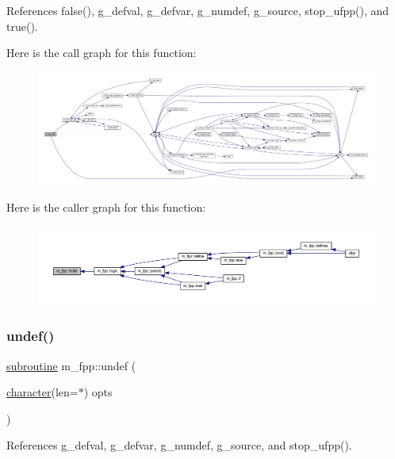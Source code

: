 References false(), g\+\_\+defval, g\+\_\+defvar, g\+\_\+numdef, g\+\_\+source, stop\+\_\+ufpp(), and true().

Here is the call graph for this function\+:
\nopagebreak
\begin{figure}[H]
\begin{center}
\leavevmode
\includegraphics[width=350pt]{namespacem__fpp_ad7c4d8aa34d0b35cd3b3ced65e261590_cgraph}
\end{center}
\end{figure}
Here is the caller graph for this function\+:
\nopagebreak
\begin{figure}[H]
\begin{center}
\leavevmode
\includegraphics[width=350pt]{namespacem__fpp_ad7c4d8aa34d0b35cd3b3ced65e261590_icgraph}
\end{center}
\end{figure}
\mbox{\label{namespacem__fpp_aa3c22b47ddfcf47940f8254d4a44c448}} 
\subsubsection{\texorpdfstring{undef()}{undef()}}
{\footnotesize\ttfamily \hyperlink{M__stopwatch_83_8txt_acfbcff50169d691ff02d4a123ed70482}{subroutine} m\+\_\+fpp\+::undef (\begin{DoxyParamCaption}\item[{\hyperlink{option__stopwatch_83_8txt_abd4b21fbbd175834027b5224bfe97e66}{character}(len=$\ast$)}]{opts }\end{DoxyParamCaption})}



References g\+\_\+defval, g\+\_\+defvar, g\+\_\+numdef, g\+\_\+source, and stop\+\_\+ufpp().

